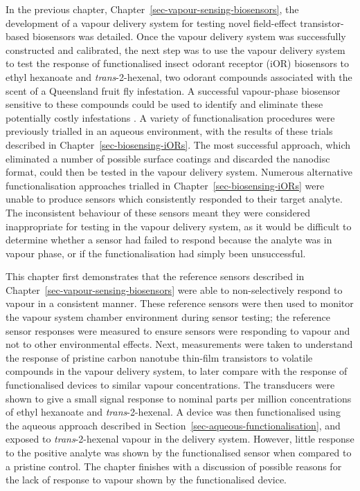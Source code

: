 \documentclass[
  a4paper,
]{scrbook}
\begin{document}
In the previous chapter, Chapter~\ref{sec-vapour-sensing-biosensors},
the development of a vapour delivery system for testing novel
field-effect transistor-based biosensors was detailed. Once the vapour
delivery system was successfully constructed and calibrated, the next
step was to use the vapour delivery system to test the response of
functionalised insect odorant receptor (iOR) biosensors to ethyl
hexanoate and \emph{trans}-2-hexenal, two odorant compounds associated
with the scent of a Queensland fruit fly infestation. A successful
vapour-phase biosensor sensitive to these compounds could be used to
identify and eliminate these potentially costly infestations
\autocite{Queensland1,Queensland2}. A variety of functionalisation
procedures were previously trialled in an aqueous environment, with the
results of these trials described in Chapter~\ref{sec-biosensing-iORs}.
The most successful approach, which eliminated a number of possible
surface coatings and discarded the nanodisc format, could then be tested
in the vapour delivery system. Numerous alternative functionalisation
approaches trialled in Chapter~\ref{sec-biosensing-iORs} were unable to
produce sensors which consistently responded to their target analyte.
The inconsistent behaviour of these sensors meant they were considered
inappropriate for testing in the vapour delivery system, as it would be
difficult to determine whether a sensor had failed to respond because
the analyte was in vapour phase, or if the functionalisation had simply
been unsuccessful.

This chapter first demonstrates that the reference sensors described in
Chapter~\ref{sec-vapour-sensing-biosensors} were able to non-selectively
respond to vapour in a consistent manner. These reference sensors were
then used to monitor the vapour system chamber environment during sensor
testing; the reference sensor responses were measured to ensure sensors
were responding to vapour and not to other environmental effects. Next,
measurements were taken to understand the response of pristine carbon
nanotube thin-film transistors to volatile compounds in the vapour
delivery system, to later compare with the response of functionalised
devices to similar vapour concentrations. The transducers were shown to
give a small signal response to nominal parts per million concentrations
of ethyl hexanoate and \emph{trans}-2-hexenal. A device was then
functionalised using the aqueous approach described in
Section~\ref{sec-aqueous-functionalisation}, and exposed to
\emph{trans}-2-hexenal vapour in the delivery system. However, little
response to the positive analyte was shown by the functionalised sensor
when compared to a pristine control. The chapter finishes with a
discussion of possible reasons for the lack of response to vapour shown
by the functionalised device.
\end{document}
